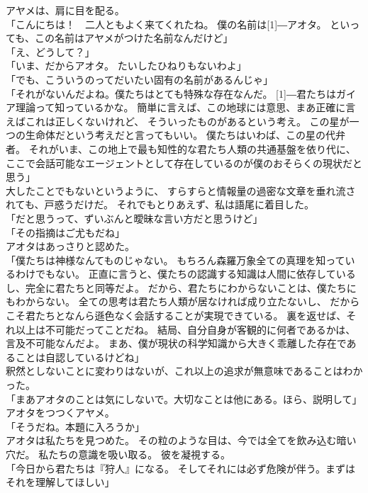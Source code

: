 \documentclass[../IHMain]{subfiles}
\begin{document}
アヤメは、肩に目を配る。\\
「こんにちは！　二人ともよく来てくれたね。
僕の名前は\scalebox{3}[1]{―}アオタ。
といっても、この名前はアヤメがつけた名前なんだけど」\\
「え、どうして？」\\
「いま、だからアオタ。
たいしたひねりもないわよ」\\
「でも、こういうのってだいたい固有の名前があるんじゃ」\\
「それがないんだよね。僕たちはとても特殊な存在なんだ。
\scalebox{3}[1]{―}君たちはガイア理論って知っているかな。
簡単に言えば、この地球には意思、まあ正確に言えばこれは正しくないけれど、
そういったものがあるという考え。
この星が一つの生命体だという考えだと言ってもいい。
僕たちはいわば、この星の代弁者。
それがいま、この地上で最も知性的な君たち人類の共通基盤を依り代に、
ここで会話可能なエージェントとして存在しているのが僕のおそらくの現状だと思う」\\
大したことでもないというように、
すらすらと情報量の過密な文章を垂れ流されても、戸惑うだけだ。
それでもとりあえず、私は語尾に着目した。\\
「だと思うって、ずいぶんと曖昧な言い方だと思うけど」\\
「その指摘はご尤もだね」\\
アオタはあっさりと認めた。\\
「僕たちは神様なんてものじゃない。
もちろん森羅万象全ての真理を知っているわけでもない。
正直に言うと、僕たちの認識する知識は人間に依存しているし、完全に君たちと同等だよ。
だから、君たちにわからないことは、僕たちにもわからない。
全ての思考は君たち人類が居なければ成り立たないし、
だからこそ君たちとなんら遜色なく会話することが実現できている。
裏を返せば、それ以上は不可能だってことだね。
結局、自分自身が客観的に何者であるかは、言及不可能なんだよ。
まあ、僕が現状の科学知識から大きく乖離した存在であることは自認しているけどね」\\
釈然としないことに変わりはないが、これ以上の追求が無意味であることはわかった。\\
「まあアオタのことは気にしないで。大切なことは他にある。ほら、説明して」\\
アオタをつつくアヤメ。\\
「そうだね。本題に入ろうか」\\
アオタは私たちを見つめた。
その粒のような目は、今では全てを飲み込む暗い穴だ。
私たちの意識を吸い取る。
彼を凝視する。\\
「今日から君たちは『狩人』になる。
そしてそれには必ず危険が伴う。まずはそれを理解してほしい」\\
\end{document}
